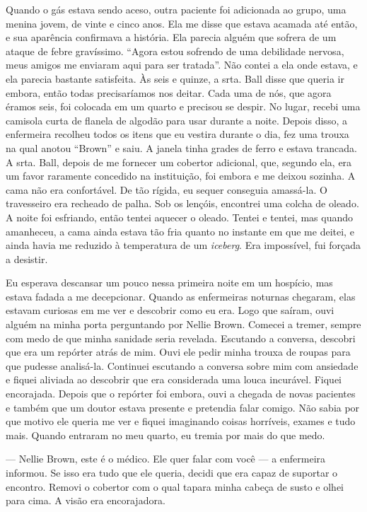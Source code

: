 Quando o gás estava sendo aceso, outra paciente foi adicionada ao grupo,
uma menina jovem, de vinte e cinco anos. Ela me disse que estava acamada
até então, e sua aparência confirmava a história. Ela parecia alguém que
sofrera de um ataque de febre gravíssimo. ``Agora estou sofrendo de
uma debilidade nervosa, meus amigos me enviaram aqui para ser tratada''.
Não contei a ela onde estava, e ela parecia bastante satisfeita. Às seis
e quinze, a srta. Ball disse que queria ir embora, então todas
precisaríamos nos deitar. Cada uma de nós, que agora éramos seis, foi
colocada em um quarto e precisou se despir. No lugar, recebi uma
camisola curta de flanela de algodão para usar durante a noite. Depois
disso, a enfermeira recolheu todos os itens que eu vestira durante o
dia, fez uma trouxa na qual anotou ``Brown'' e saiu. A janela tinha
grades de ferro e estava trancada. A srta. Ball, depois de me fornecer
um cobertor adicional, que, segundo ela, era um favor raramente
concedido na instituição, foi embora e me deixou sozinha. A cama não era
confortável. De tão rígida, eu sequer conseguia amassá-la. O travesseiro
era recheado de palha. Sob os lençóis, encontrei uma colcha de oleado. A
noite foi esfriando, então tentei aquecer o oleado. Tentei e tentei, mas
quando amanheceu, a cama ainda estava tão fria quanto no instante em que
me deitei, e ainda havia me reduzido à temperatura de um \emph{iceberg}. Era
impossível, fui forçada a desistir.

Eu esperava descansar um pouco nessa primeira noite em um hospício, mas
estava fadada a me decepcionar. Quando as enfermeiras noturnas chegaram,
elas estavam curiosas em me ver e descobrir como eu era. Logo que
saíram, ouvi alguém na minha porta perguntando por Nellie Brown. Comecei
a tremer, sempre com medo de que minha sanidade seria revelada.
Escutando a conversa, descobri que era um repórter atrás de mim. Ouvi
ele pedir minha trouxa de roupas para que pudesse analisá-la. Continuei
escutando a conversa sobre mim com ansiedade e fiquei aliviada ao
descobrir que era considerada uma louca incurável. Fiquei encorajada.
Depois que o repórter foi embora, ouvi a chegada de novas pacientes e
também que um doutor estava presente e pretendia falar comigo. Não sabia
por que motivo ele queria me ver e fiquei imaginando coisas horríveis,
exames e tudo mais. Quando entraram no meu quarto, eu tremia por mais do
que medo.

--- Nellie Brown, este é o médico. Ele quer falar com você --- a
enfermeira informou. Se isso era tudo que ele queria, decidi que era
capaz de suportar o encontro. Removi o cobertor com o qual tapara minha
cabeça de susto e olhei para cima. A visão era encorajadora.

